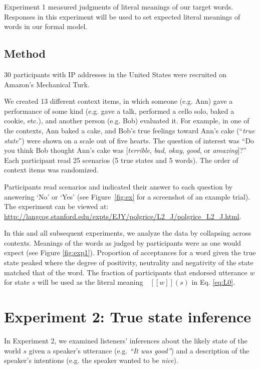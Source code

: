\documentclass[10pt,letterpaper]{article}
\newcommand{\denote}[1]{\mbox{ $[\![ #1 ]\!]$}}
\begin{document}
Experiment 1 measured judgments of literal meanings of our target words.
Responses in this experiment will be used to set expected literal meanings of words in our formal model.

\subsection{Method}

30 participants with IP addresses in the United States were recruited on Amazon's Mechanical Turk.

We created 13 different context items, in which someone (e.g. Ann) gave a performance of some kind (e.g. gave a talk, performed a cello solo, baked a cookie, etc.), and another person (e.g. Bob) evaluated it. For example, in one of the contexts, Ann baked a cake, and Bob's true feelings toward Ann's cake (``\emph{true state}'') were shown on a scale out of five hearts. The question of interest was ``Do you think Bob thought Ann's cake was [\emph{terrible}, \emph{bad}, \emph{okay}, \emph{good}, or \emph{amazing}]?'' Each participant read 25 scenarios (5 true states and 5 words). 
The order of context items was randomized.

Participants read scenarios and indicated their answer to each question by answering `No' or `Yes' (see Figure~\ref{fig:ex} for a screenshot of an example trial).
The experiment can be viewed at: \url{http://langcog.stanford.edu/expts/EJY/polgrice/L2_J/polgrice_L2_J.html}.

In this and all subsequent experiments, we analyze the data by collapsing across contexts.
Meanings of the words as judged by participants were as one would expect (see Figure \ref{fig:exp1}).
Proportion of acceptances for a word given the true state peaked where the degree of positivity, neutrality and negativity of the state matched that of the word.
The fraction of participants that endorsed utterance $w$ for state $s$ will be used as the literal meaning $\denote{w}(s)$ in Eq. \ref{eq:L0}.

\section{Experiment 2: True state inference}

In Experiment 2, we examined listeners' inferences about the likely state of the world $s$ given a speaker's utterance (e.g. \emph{``It was good''}) and a description of the speaker's intentions (e.g. the speaker wanted to be \emph{nice}).
\end{document}
